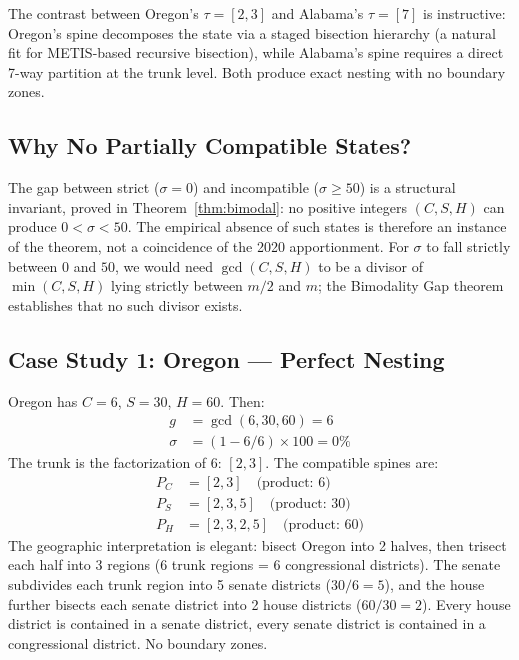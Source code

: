 The contrast between Oregon's $\tau = [2,3]$ and Alabama's $\tau = [7]$ is
instructive: Oregon's spine decomposes the state via a staged bisection hierarchy
(a natural fit for METIS-based recursive bisection), while Alabama's spine
requires a direct 7-way partition at the trunk level.  Both produce exact
nesting with no boundary zones.

\subsection{Why No Partially Compatible States?}

The gap between strict ($\sigma = 0$) and incompatible ($\sigma \geq 50$)
is a structural invariant, proved in Theorem~\ref{thm:bimodal}: no positive
integers $(C, S, H)$ can produce $0 < \sigma < 50$.  The empirical absence of
such states is therefore an instance of the theorem, not a coincidence of the
2020 apportionment.  For $\sigma$ to fall strictly between $0$ and $50$, we
would need $\gcd(C,S,H)$ to be a divisor of $\min(C,S,H)$ lying strictly
between $m/2$ and $m$; the Bimodality Gap theorem establishes that no such
divisor exists.

\subsection{Case Study 1: Oregon --- Perfect Nesting}

Oregon has $C = 6$, $S = 30$, $H = 60$.  Then:
\begin{align*}
  g &= \gcd(6, 30, 60) = 6 \\
  \sigma &= (1 - 6/6) \times 100 = 0\%
\end{align*}
The trunk is the factorization of 6: $[2, 3]$.  The compatible spines are:
\begin{align*}
  P_C &= [2, 3] \quad \text{(product: }6\text{)} \\
  P_S &= [2, 3, 5] \quad \text{(product: }30\text{)} \\
  P_H &= [2, 3, 2, 5] \quad \text{(product: }60\text{)}
\end{align*}
The geographic interpretation is elegant: bisect Oregon into 2 halves, then
trisect each half into 3 regions (6 trunk regions = 6 congressional districts).
The senate subdivides each trunk region into 5 senate districts ($30/6 = 5$),
and the house further bisects each senate district into 2 house districts
($60/30 = 2$).  Every house district is contained in a senate district, every
senate district is contained in a congressional district.  No boundary zones.

